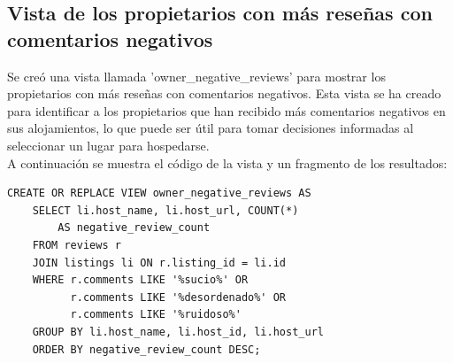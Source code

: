 \subsection{Vista de los propietarios con más reseñas con comentarios negativos}

Se creó una vista llamada 'owner\_negative\_reviews' para mostrar los propietarios con más reseñas con comentarios negativos. Esta vista se ha creado para identificar a los propietarios que han recibido más comentarios negativos en sus alojamientos, lo que puede ser útil para tomar decisiones informadas al seleccionar un lugar para hospedarse. \\A continuación se muestra el código de la vista y un fragmento de los resultados:

\begin{verbatim}
CREATE OR REPLACE VIEW owner_negative_reviews AS
    SELECT li.host_name, li.host_url, COUNT(*) 
        AS negative_review_count
    FROM reviews r
    JOIN listings li ON r.listing_id = li.id
    WHERE r.comments LIKE '%sucio%' OR
          r.comments LIKE '%desordenado%' OR
          r.comments LIKE '%ruidoso%'
    GROUP BY li.host_name, li.host_id, li.host_url
    ORDER BY negative_review_count DESC;
\end{verbatim}
